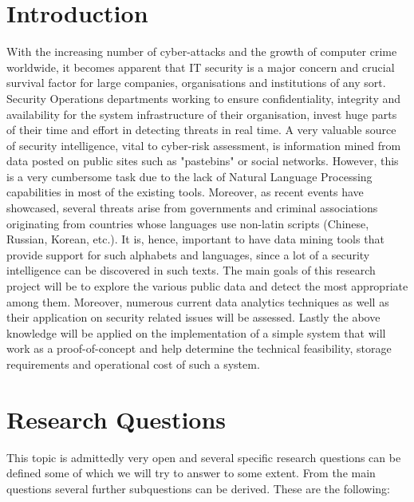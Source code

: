 \documentclass[12pt]{article}
\begin{document}
\tableofcontents

\newpage

\section*{Introduction}
With the increasing number of cyber-attacks and the growth of computer crime worldwide, it becomes apparent that IT security is a major concern and crucial survival factor for large companies, organisations and institutions of any sort. Security Operations departments working to ensure confidentiality, integrity and availability for the system infrastructure of their organisation, invest huge parts of their time and effort in detecting threats in real time. A very valuable source of security intelligence, vital to cyber-risk assessment, is information mined from data posted on public sites such as "pastebins" or social networks. However, this is a very cumbersome task due to the lack of Natural Language Processing capabilities in most of the existing tools. Moreover, as recent events have showcased, several threats arise from governments and criminal associations originating from countries whose languages use non-latin scripts (Chinese, Russian, Korean, etc.). It is, hence, important to have data mining tools that provide support for such alphabets and languages, since a lot of a security intelligence can be discovered in such texts. The main goals of this research project will be to explore the various public data and detect the most appropriate among them. Moreover, numerous current data analytics techniques as well as their application on security related issues will be assessed. Lastly the above knowledge will be applied on the implementation of a simple system that will work as a proof-of-concept and help determine the technical feasibility, storage requirements and operational cost of such a system.  

\section{Research Questions}
This topic is admittedly very open and several specific research questions can be defined some of which we will try to answer to some extent. From the main questions several further subquestions can be derived. These are the following:
\end{document}
